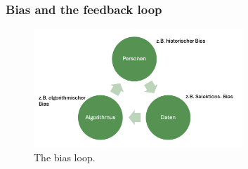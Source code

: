 


\subsubsection*{Bias and the feedback loop}
\begin{figure}
    \centering
    \includegraphics[width=0.7\textwidth]{../figures/bias_loop.png}
    \caption{The bias loop.}
    \label{fig:bias_loop}
\end{figure}

